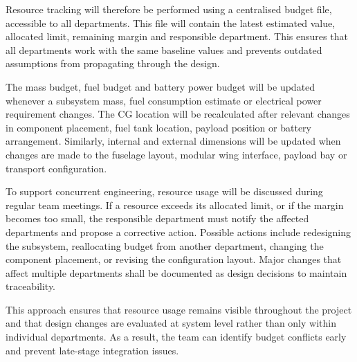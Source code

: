 Resource tracking will therefore be performed using a centralised budget file, accessible to all departments. This file will contain the latest estimated value, allocated limit, remaining margin and responsible department. This ensures that all departments work with the same baseline values and prevents outdated assumptions from propagating through the design.

The mass budget, fuel budget and battery power budget will be updated whenever a subsystem mass, fuel consumption estimate or electrical power requirement changes. The CG location will be recalculated after relevant changes in component placement, fuel tank location, payload position or battery arrangement. Similarly, internal and external dimensions will be updated when changes are made to the fuselage layout, modular wing interface, payload bay or transport configuration.

To support concurrent engineering, resource usage will be discussed during regular team meetings. If a resource exceeds its allocated limit, or if the margin becomes too small, the responsible department must notify the affected departments and propose a corrective action. Possible actions include redesigning the subsystem, reallocating budget from another department, changing the component placement, or revising the configuration layout. Major changes that affect multiple departments shall be documented as design decisions to maintain traceability.

This approach ensures that resource usage remains visible throughout the project and that design changes are evaluated at system level rather than only within individual departments. As a result, the team can identify budget conflicts early and prevent late-stage integration issues.





